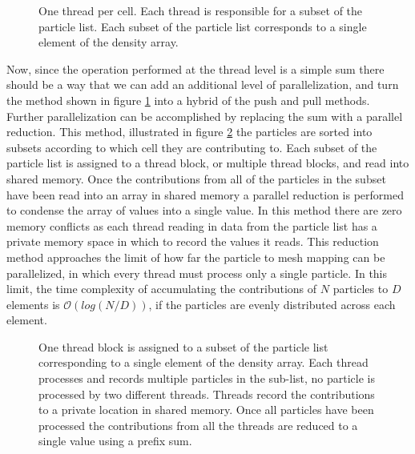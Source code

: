 \begin{figure}
\begin{center}

\end{center}
\caption[One thread per cell]{One thread per cell. Each thread is responsible for a subset of the particle list. Each subset of the particle list corresponds to a single element of the density array.}
\label{fig:one_thread_per_cell}
\end{figure}

Now, since the operation performed at the thread level is a simple sum there should be a way that we can add an additional level of parallelization, and turn the method shown in figure \ref{fig:one_thread_per_cell} into a hybrid of the push and pull methods. Further parallelization can be accomplished by replacing the sum with a parallel reduction. This method, illustrated in figure \ref{fig:one_cell_per_block} the particles are sorted into subsets according to which cell they are contributing to. Each subset of the particle list is assigned to a thread block, or multiple thread blocks, and read into shared memory. Once the contributions from all of the particles in the subset have been read into an array in shared memory a parallel reduction is performed to condense the array of values into a single value. In this method there are zero memory conflicts as each thread reading in data from the particle list has a private memory space in which to record the values it reads. 
This reduction method approaches the limit of how far the particle to mesh mapping can be parallelized, in which every thread must process only a single particle. In this limit, the time complexity of accumulating the contributions of $N$ particles to $D$ elements is $\mathcal{O}(log(N/D))$, if the particles are evenly distributed across each element. 

\begin{figure}
\begin{center}

\end{center}
\caption[One thread block per cell]{One thread block is assigned to a subset of the particle list corresponding to a single element of the density array. Each thread processes and records multiple particles in the sub-list, no particle is processed by two different threads. Threads record the contributions to a private location in shared memory. Once all particles have been processed the contributions from all the threads are reduced to a single value using a prefix sum.}
\label{fig:one_cell_per_block}
\end{figure}




